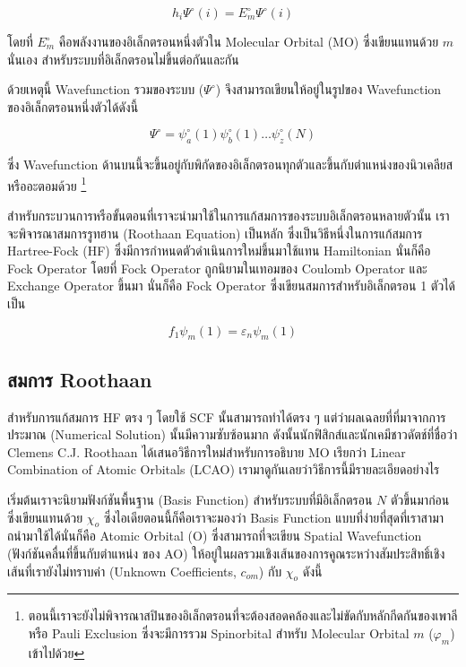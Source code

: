 \begin{equation}
    h_{i} \Psi^{\circ}(i) = E^{\circ}_{m} \Psi^{\circ}(i)
\end{equation}

โดยที่ $E^{\circ}_{m}$ คือพลังงานของอิเล็กตรอนหนึ่งตัวใน Molecular Orbital (MO) ซึ่งเขียนแทนด้วย $m$ นั่นเอง สำหรับระบบที่อิเล็กตรอนไม่ขึ้นต่อกันและกัน

ด้วยเหตุนี้ Wavefunction รวมของระบบ ($\Psi^{\circ}$) จึงสามารถเขียนให้อยู่ในรูปของ Wavefunction ของอิเล็กตรอนหนึ่งตัวได้ดังนี้

\begin{equation}
    \Psi^{\circ} = \psi^{\circ}_{a}(1) \psi^{\circ}_{b}(1) \dots \psi^{\circ}_{z}(N)
\end{equation}

ซึ่ง Wavefunction ด้านบนนี้จะขึ้นอยู่กับพิกัดของอิเล็กตรอนทุกตัวและขึ้นกับตำแหน่งของนิวเคลียสหรืออะตอมด้วย
\footnote{ตอนนี้เราจะยังไม่พิจารณาสปินของอิเล็กตรอนที่จะต้องสอดคล้องและไม่ขัดกับหลักกีดกันของเพาลีหรือ Pauli Exclusion 
ซึ่งจะมีการรวม Spinorbital สำหรับ Molecular Orbital $m$ ($\varphi_{m}$) เข้าไปด้วย}

สำหรับกระบวนการหรือขั้นตอนที่เราจะนำมาใช้ในการแก้สมการของระบบอิเล็กตรอนหลายตัวนั้น เราจะพิจารณาสมการรูทฮาน (Roothaan Equation) เป็นหลัก
ซึ่งเป็นวิธีหนึ่งในการแก้สมการ Hartree-Fock (HF) ซึ่งมีการกำหนดตัวดำเนินการใหม่ขึ้นมาใช้แทน Hamiltonian นั่นก็คือ Fock Operator 
โดยที่ Fock Operator ถูกนิยามในเทอมของ Coulomb Operator และ Exchange Operator ขึ้นมา นั่นก็คือ Fock Operator 
ซึ่งเขียนสมการสำหรับอิเล็กตรอน 1 ตัวได้เป็น

\begin{equation}
    \label{eq:fock}
    f_{1} \psi_{m}(1) = \varepsilon_{n} \psi_{m}(1)
\end{equation}

\subsection{สมการ Roothaan}

สำหรับการแก้สมการ HF ตรง ๆ โดยใช้ SCF นั้นสามารถทำได้ตรง ๆ แต่ว่าผลเฉลยที่ที่มาจากการประมาณ (Numerical Solution) นั้นมีความซับซ้อนมาก
ดังนั้นนักฟิสิกส์และนักเคมีชาวดัตช์ที่ชื่อว่า Clemens C.J. Roothaan ได้เสนอวิธีการใหม่สำหรับการอธิบาย MO เรียกว่า Linear Combination of Atomic Orbitals (LCAO)
เรามาดูกันเลยว่าวิธีการนี้มีรายละเอียดอย่างไร

เริ่มต้นเราจะนิยามฟังก์ชันพื้นฐาน (Basis Function) สำหรับระบบที่มีอิเล็กตรอน $N$ ตัวขึ้นมาก่อน ซึ่งเขียนแทนด้วย $\chi_{o}$
ซึ่งไอเดียตอนนี้ก็คือเราจะมองว่า Basis Function แบบที่ง่ายที่สุดที่เราสามาถนำมาใช้ได้นั่นก็คือ Atomic Orbital (O) ซึ่งสามารถที่จะเขียน Spatial Wavefunction 
(ฟังก์ชันคลื่นที่ขึ้นกับตำแหน่ง ของ AO) ให้อยู่ในผลรวมเชิงเส้นของการคูณระหว่างสัมประสิทธิ์เชิงเส้นที่เรายังไม่ทราบค่า (Unknown Coefficients, $c_{om}$) 
กับ $\chi_{o}$ ดังนี้

